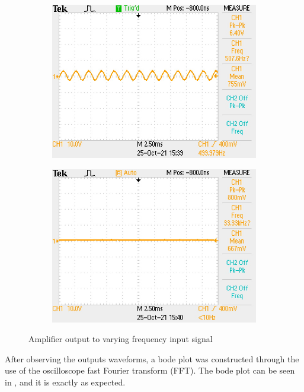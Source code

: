 \documentclass[a4paper,11pt]{article}
\begin{document}
\begin{figure}[H]
\begin{subfigure}{0.3\textwidth}
        \includegraphics[width=\columnwidth]{power_output/filter_output_500Hz.JPG}
        \label{F:out_500hz}
    \end{subfigure}
    \begin{subfigure}{0.3\textwidth}
        \includegraphics[width=\columnwidth]{power_output/filter_output_2kHz.JPG}
        \label{F:out_2khz}
    \end{subfigure}
    \label{F:output_plotting}
    \caption{Amplifier output to varying frequency input signal}
\end{figure}

After observing the outputs waveforms, a bode plot was constructed through the use of the oscilloscope fast Fourier transform (FFT). The bode plot can be seen in , and it is exactly as expected.
\end{document}
